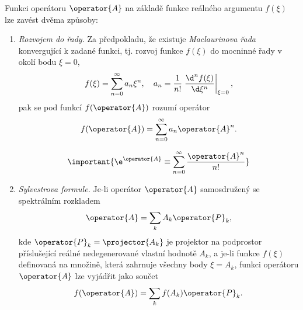 Funkci operátoru $\operator{A}$ na základě funkce reálného argumentu $f(\xi)$ lze zavést dvěma způsoby:
\begin{enumerate}
\item
    \emph{Rozvojem do řady.}
    Za předpokladu, že existuje \emph{Maclaurinova řada} konvergující k zadané funkci, tj. rozvoj funkce $f(\xi)$ do mocninné řady v okolí bodu $\xi=0$,
    \begin{equation}
        f(\xi)=\sum_{n=0}^{\infty}a_{n}\xi^{n},\quad 
        a_{n}=\frac{1}{n!}\left.\frac{\d^{n}f(\xi)}{\d\xi^{n}}\right|_{\xi=0},
    \end{equation}
    pak se pod funkcí $f(\operator{A})$ rozumí operátor
    \begin{equation}
        f(\operator{A})
            =\sum_{n=0}^{\infty}a_{n}\operator{A}^{n}.
        \label{eq:OperatorFncArray}
    \end{equation}	
    
    \begin{example}
        \begin{equation}
            \important{
                \e^{\operator{A}}
                    \equiv\sum_{n=0}^{\infty}\frac{\operator{A}^{n}}{n!}
            }
            \label{eq:OperatorExp}
        \end{equation}
    \end{example}
        
\item
    \emph{Sylvestrova formule.}
    Je-li operátor $\operator{A}$ samosdružený se spektrálním rozkladem
    \begin{equation}
        \operator{A}
            =\sum_{k}A_{k}\operator{P}_{k},
    \end{equation}
    kde $\operator{P}_{k}=\projector{A_{k}}$ je projektor na podprostor příslušející reálné nedegenerované vlastní hodnotě $A_{k}$, a je-li funkce $f(\xi)$ definovaná na množině, která zahrnuje všechny body $\xi=A_{k}$, funkci operátoru $\operator{A}$ lze vyjádřit jako součet
    \begin{equation}
        f(\operator{A})
            =\sum_{k}f(A_{k})\operator{P}_{k}.
        \label{eq:OperatorFncSylvester}
    \end{equation}		
\end{enumerate}
